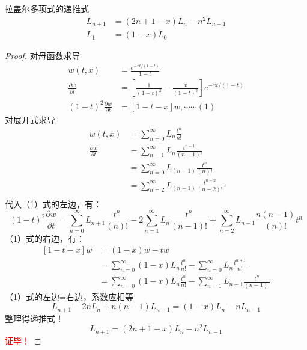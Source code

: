 		\begin{proposition}拉盖尔多项式的递推式
			\begin{equation*}
			\begin{split}
				L_{n+1} &= (2n+1-x) L_n  -n^2 L_{n-1}  \\
				L_1 &=(1-x) L_0 
			\end{split}		
			\end{equation*}	
		\end{proposition}
		\begin{proof}
		对母函数求导
			\begin{equation*}
				\begin{split}
					w(t,x) &=\frac{e^{-xt/(1-t) } } {1-t}\\
					\frac{\partial w}{\partial t}  &= [\frac{1}{(1-t)^2} -\frac{x}{(1-t)^3}]  e^{-xt/(1-t) }     \\
					(1-t)^2	\frac{\partial w}{\partial t}  &= [1 -t-x] w   , \cdots \cdots  (1)
				\end{split}		
				\end{equation*}
		对展开式求导	
				\begin{equation*}
					\begin{split}
						w(t,x) &= \sum_{n=0}^{\infty}  L_n  \frac{t^n}{n!} \\
						\frac{\partial w}{\partial t}  &=   \sum_{n=1}^{\infty}  L_n  \frac{t^{n-1}}{(n-1)!}   \\
						&=  \sum_{n=0}^{\infty}  L_{(n+1)}  \frac{t^n}{(n)!} \\
						&=  \sum_{n=2}^{\infty}  L_{(n-1)}  \frac{t^{n-2}}{(n-2)!} \\
					\end{split}		
					\end{equation*}	
					代入（1）式的左边，有：
					\begin{equation*}
						(1-t)^2	\frac{\partial w}{\partial t}  =   \sum_{n=0}^{\infty}  L_{n+1}  \frac{t^n}{(n)!}  -2  \sum_{n=1}^{\infty}  L_{n}  \frac{t^n}{(n-1)!} +  \sum_{n=2}^{\infty}  L_{n-1}  \frac{n(n-1)}{(n)!}  t^n
					\end{equation*}	
					（1）式的右边，有：
					\begin{equation*}
						\begin{split}
							[1 -t-x] w &= (1-x)w -t w \\
							& =   \sum_{n=0}^{\infty} (1-x) L_n  \frac{t^n}{n!} -  \sum_{n=0}^{\infty}  L_n  \frac{t^{n+1}}{n!} \\
							&=  \sum_{n=0}^{\infty} (1-x) L_n  \frac{t^n}{n!} -  \sum_{n=1}^{\infty}  L_{n-1}  \frac{t^n}{(n-1)!}
						\end{split}		
					\end{equation*}	
					（1）式的左边=右边，系数应相等
					\[ L_{n+1} - 2 n L_{n} + n(n-1) L_{n-1} = (1-x) L_n  - n L_{n-1}   \]
					整理得递推式！
					\begin{equation*}
							L_{n+1} = (2n+1-x) L_n  -n^2 L_{n-1}  
					\end{equation*}	
		\textcolor{red}{证毕！}
		\end{proof}
		~~\\ 
	
